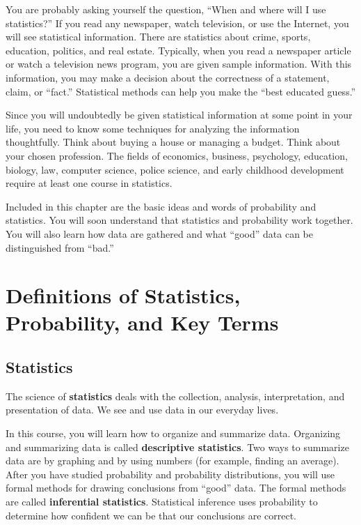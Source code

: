 \documentclass[
  letterpaper,
  DIV=11,
  numbers=noendperiod]{scrreprt}
\begin{document}
You are probably asking yourself the question, ``When and where will I
use statistics?'' If you read any newspaper, watch television, or use
the Internet, you will see statistical information. There are statistics
about crime, sports, education, politics, and real estate. Typically,
when you read a newspaper article or watch a television news program,
you are given sample information. With this information, you may make a
decision about the correctness of a statement, claim, or ``fact.''
Statistical methods can help you make the ``best educated guess.''

Since you will undoubtedly be given statistical information at some
point in your life, you need to know some techniques for analyzing the
information thoughtfully. Think about buying a house or managing a
budget. Think about your chosen profession. The fields of economics,
business, psychology, education, biology, law, computer science, police
science, and early childhood development require at least one course in
statistics.

Included in this chapter are the basic ideas and words of probability
and statistics. You will soon understand that statistics and probability
work together. You will also learn how data are gathered and what
``good'' data can be distinguished from ``bad.''

\chapter{Definitions of Statistics, Probability, and Key
Terms}\label{definitions-of-statistics-probability-and-key-terms}

\section{Statistics}\label{statistics}

The science of \textbf{statistics} deals with the collection, analysis,
interpretation, and presentation of data. We see and use data in our
everyday lives.

In this course, you will learn how to organize and summarize data.
Organizing and summarizing data is called \textbf{descriptive
statistics}. Two ways to summarize data are by graphing and by using
numbers (for example, finding an average). After you have studied
probability and probability distributions, you will use formal methods
for drawing conclusions from ``good'' data. The formal methods are
called \textbf{inferential statistics}. Statistical inference uses
probability to determine how confident we can be that our conclusions
are correct.
\end{document}

